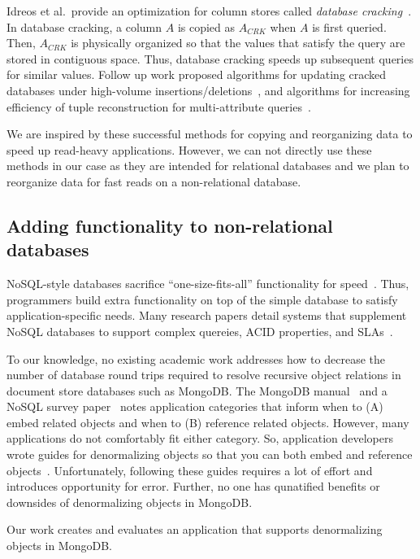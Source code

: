 Idreos et al.~provide an optimization for column stores called {\em database cracking}~\cite{Pirk2007}.
In database cracking, a column $A$ is copied as $A_{CRK}$ when $A$ is first queried.
Then, $A_{CRK}$ is physically organized so that the values that satisfy the query are stored in contiguous space.
Thus, database cracking speeds up subsequent queries for similar values.
Follow up work proposed algorithms for updating cracked databases under high-volume insertions/deletions~\cite{Idreos2007}, and algorithms for increasing efficiency of tuple reconstruction for multi-attribute queries~\cite{Idreos2009}.

We are inspired by these successful methods for copying and reorganizing data to speed up read-heavy applications.
However, we can not directly use these methods in our case as they are intended for relational databases and we plan to reorganize data for fast reads on a non-relational database. 

\subsection{Adding functionality to non-relational databases} 
NoSQL-style databases sacrifice ``one-size-fits-all'' functionality for speed~\cite{Strauch}.
Thus, programmers build extra functionality on top of the simple database to satisfy application-specific needs.
Many research papers detail systems that supplement NoSQL databases to support complex quereies, ACID properties, and SLAs~\cite{Decandia2007,Chang,Beaver2010,Baker}. 

To our knowledge, no existing academic work addresses how to decrease the number of database round trips required to resolve recursive object relations in document store databases such as MongoDB.
The MongoDB manual~\cite{MongoDB2014} and a NoSQL survey paper~\cite{Strauch} notes application categories that inform when to (A) embed related objects and when to (B) reference related objects.
However, many applications do not comfortably fit either category.
So, application developers wrote guides for denormalizing objects so that you can both embed and reference objects~\cite{Wanschik2010}.
Unfortunately, following these guides requires a lot of effort and introduces opportunity for error.
Further, no one has qunatified benefits or downsides of denormalizing objects in MongoDB.

Our work creates and evaluates an application that supports denormalizing objects in MongoDB.



% 
